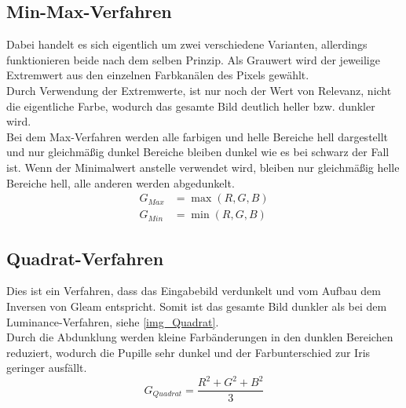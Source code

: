 \subsection{Min-Max-Verfahren}
\label{gray_MinMax}
Dabei handelt es sich eigentlich um zwei verschiedene Varianten, allerdings funktionieren beide nach dem selben Prinzip. Als Grauwert wird der jeweilige Extremwert aus den einzelnen Farbkanälen des Pixels gewählt.\\
Durch Verwendung der Extremwerte, ist nur noch der Wert von Relevanz, nicht die eigentliche Farbe, wodurch das gesamte Bild deutlich heller bzw. dunkler wird.\\
Bei dem Max-Verfahren werden alle farbigen und helle Bereiche hell dargestellt und nur gleichmäßig dunkel Bereiche bleiben dunkel wie es bei schwarz der Fall ist. Wenn der Minimalwert anstelle verwendet wird, bleiben nur gleichmäßig helle Bereiche hell, alle anderen werden abgedunkelt.
\begin{align*}
G_{Max} &= \max(R,G,B)\\
G_{Min} &= \min(R,G,B)
\end{align*}
\subsection{Quadrat-Verfahren}
\label{gray_Quadrat}
Dies ist ein Verfahren, dass das Eingabebild verdunkelt und vom Aufbau dem Inversen von Gleam entspricht. Somit ist das gesamte Bild dunkler als bei dem Luminance-Verfahren, siehe \autoref{img_Quadrat}.\\
Durch die Abdunklung werden kleine Farbänderungen in den dunklen Bereichen reduziert, wodurch die Pupille sehr dunkel und der Farbunterschied zur Iris geringer ausfällt.
\[G_{Quadrat}=\dfrac{R^2+G^2+B^2}{3}\]
